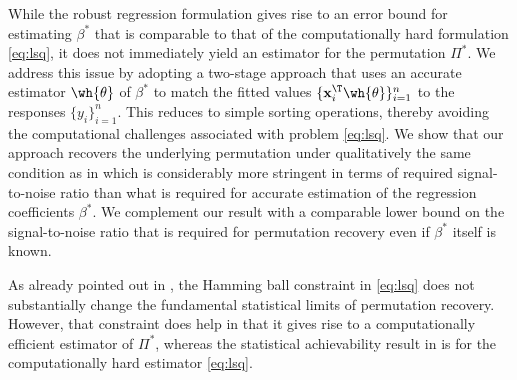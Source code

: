 \documentclass[11pt]{article}
\def\x{\mathbf{x}}
\begin{document}
While the robust regression formulation gives rise to an error bound for estimating $\beta^*$ that is comparable to that of the computationally hard formulation \eqref{eq:lsq}, it does not immediately yield an estimator for the permutation $\Pi^*$. We address this issue by adopting a two-stage approach that uses an accurate estimator $\wh{\theta}$ of $\beta^*$ to match the fitted values $\{ \x_i^{\T} \wh{\theta} \}_{i = 1}^n$ to the responses $\{ y_i \}_{i = 1}^n$. This reduces to simple sorting operations, thereby avoiding the computational challenges associated with problem \eqref{eq:lsq}. We show that our approach recovers the underlying permutation under qualitatively the same condition as in \cite{Pananjady2016} which is considerably more stringent in terms of required signal-to-noise ratio than what is required for accurate estimation of the regression coefficients $\beta^*$. We complement our result with a comparable lower bound on the signal-to-noise ratio that is required for permutation recovery even if $\beta^*$ itself is known. 

As already pointed out in \cite{Pananjady2016}, the Hamming ball constraint in \eqref{eq:lsq} does not substantially change the fundamental statistical limits of permutation recovery. However, that constraint does help in that it gives rise to a computationally efficient estimator of $\Pi^*$, whereas the statistical achievability result in \cite{Pananjady2016} is for the computationally hard estimator \eqref{eq:lsq}. 




\end{document}
